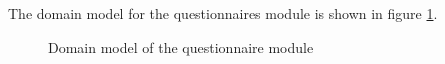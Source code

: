 The domain model for the questionnaires module is shown in figure \ref{fig:survey_domainModel}.

\begin{figure}[htb]
\begin{center}
\end{center}
\caption{ Domain model of the questionnaire module \label{fig:survey_domainModel}}
\end{figure}
